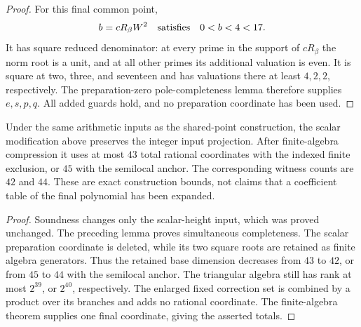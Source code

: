 \begin{proof}
For this final common point,
\[
 b=cR_\beta W^2\quad\hbox{satisfies}\quad
 0<b<4<17.
\]
It has square reduced denominator: at every prime in the support
of $cR_\beta$ the norm root is a unit, and at all other primes
its additional valuation is even.  It is square at two, three,
and seventeen and has valuations there at least $4,2,2$,
respectively.  The preparation-zero pole-completeness lemma
therefore supplies $e,s,p,q$.  All added guards hold, and no
preparation coordinate has been used.
\end{proof}

\begin{theorem}
\label{thm:shared43}
Under the same arithmetic inputs as the shared-point construction,
the scalar modification above preserves the integer input projection.
After finite-algebra compression it uses at most $43$ total rational
coordinates with the indexed finite exclusion, or $45$ with the
semilocal anchor.  The corresponding witness counts are $42$ and
$44$.  These are exact construction bounds, not claims that a
coefficient table of the final polynomial has been expanded.
\end{theorem}
\begin{proof}
Soundness changes only the scalar-height input, which was proved
unchanged.  The preceding lemma proves simultaneous completeness.
The scalar preparation coordinate is deleted, while its two square
roots are retained as finite algebra generators.  Thus the retained
base dimension decreases from $43$ to $42$, or from $45$ to $44$
with the semilocal anchor.  The triangular algebra still has rank
at most $2^{39}$, or $2^{40}$, respectively.  The enlarged fixed
correction set is combined by a product over its branches and
adds no rational coordinate.  The finite-algebra theorem supplies
one final coordinate, giving the asserted totals.
\end{proof}
